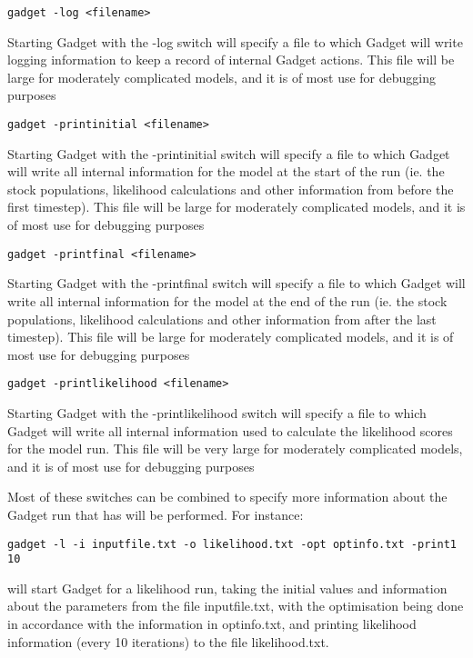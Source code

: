 \documentclass [a4paper, 10pt]{book}
\begin{document}
{\small\begin{verbatim}
gadget -log <filename>
\end{verbatim}}
Starting Gadget with the -log switch will specify a file to which Gadget will write logging information to keep a record of internal Gadget actions.  This file will be large for moderately complicated models, and it is of most use for debugging purposes

{\small\begin{verbatim}
gadget -printinitial <filename>
\end{verbatim}}
Starting Gadget with the -printinitial switch will specify a file to which Gadget will write all internal information for the model at the start of the run (ie. the stock populations, likelihood calculations and other information from before the first timestep).  This file will be large for moderately complicated models, and it is of most use for debugging purposes

{\small\begin{verbatim}
gadget -printfinal <filename>
\end{verbatim}}
Starting Gadget with the -printfinal switch will specify a file to which Gadget will write all internal information for the model at the end of the run (ie. the stock populations, likelihood calculations and other information from after the last timestep).  This file will be large for moderately complicated models, and it is of most use for debugging purposes

{\small\begin{verbatim}
gadget -printlikelihood <filename>
\end{verbatim}}
Starting Gadget with the -printlikelihood switch will specify a file to which Gadget will write all internal information used to calculate the likelihood scores for the model run.  This file will be very large for moderately complicated models, and it is of most use for debugging purposes

\newpage %
Most of these switches can be combined to specify more information about the Gadget run that has will be performed.  For instance:

{\small\begin{verbatim}
gadget -l -i inputfile.txt -o likelihood.txt -opt optinfo.txt -print1 10
\end{verbatim}}

will start Gadget for a likelihood run, taking the initial values and information about the parameters from the file inputfile.txt, with the optimisation being done in accordance with the information in optinfo.txt, and printing likelihood information (every 10 iterations) to the file likelihood.txt.
\end{document}
